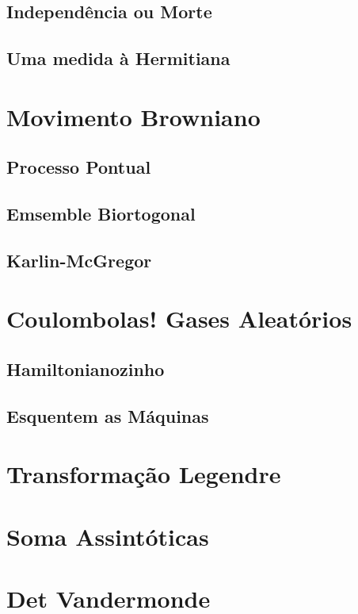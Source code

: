 \documentclass[11pt,oneside,a4paper]{report}
\begin{document}
\section{Independência ou Morte}


\section{Uma medida à Hermitiana}


\chapter{Movimento Browniano}


\section{Processo Pontual}


\section{Emsemble Biortogonal}


\section{Karlin-McGregor}


\chapter{Coulombolas! Gases Aleatórios}


\section{Hamiltonianozinho}


\section{Esquentem as Máquinas}


{}


\appendix
\chapter{Transformação Legendre}
\label{apdx: legendre}


\chapter{Soma Assintóticas}
\label{apdx: somaassin}


\chapter{Det Vandermonde}
\label{apdx: vandermonde}

\end{document}

